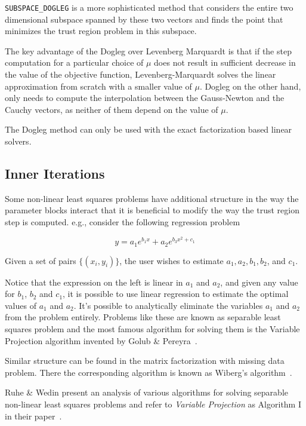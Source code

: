  \texttt{SUBSPACE\_DOGLEG} is a more sophisticated method
that considers the entire two dimensional subspace spanned by these
two vectors and finds the point that minimizes the trust region
problem in this subspace\cite{byrd1988approximate}.

The key advantage of the Dogleg over Levenberg Marquardt is that if the step computation for a particular choice of $\mu$ does not result in sufficient decrease in the value of the objective function, Levenberg-Marquardt solves the linear approximation from scratch with a smaller value of $\mu$. Dogleg on the other hand, only needs to compute the interpolation between the Gauss-Newton and the Cauchy vectors, as neither of them depend on the value of $\mu$.

The Dogleg method can only be used with the exact factorization based linear solvers.

\subsection{Inner Iterations}
\label{sec:inner}
Some non-linear least squares problems have additional structure in
the way the parameter blocks interact that it is beneficial to modify
the way the trust region step is computed. e.g., consider the
following regression problem

\begin{equation}
  y = a_1 e^{b_1 x} + a_2 e^{b_3 x^2 + c_1}
\end{equation}

Given a set of pairs $\{(x_i, y_i)\}$, the user wishes to estimate
$a_1, a_2, b_1, b_2$, and $c_1$.

Notice that the expression on the left is linear in $a_1$ and $a_2$,
and given any value for $b_1$, $b_2$ and $c_1$, it is possible to use
linear regression to estimate the optimal values of $a_1$ and
$a_2$. It's possible to analytically eliminate the variables
$a_1$ and $a_2$ from the problem entirely. Problems like these are
known as separable least squares problem and the most famous algorithm
for solving them is the Variable Projection algorithm invented by
Golub \& Pereyra~\cite{golub-pereyra-73}.

Similar structure can be found in the matrix factorization with
missing data problem. There the corresponding algorithm is
known as Wiberg's algorithm~\cite{wiberg}.

Ruhe \& Wedin  present an analysis of
various algorithms for solving separable non-linear least
squares problems and refer to {\em Variable Projection} as
Algorithm I in their paper~\cite{ruhe-wedin}.

